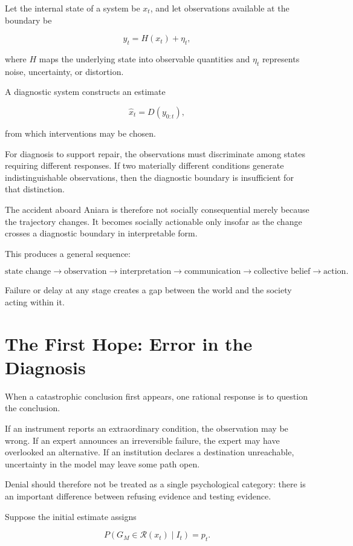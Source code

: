 \documentclass[11pt,oneside]{book}
\theoremstyle{definition}
\theoremstyle{remark}
\newcommand{\R}{\mathcal{R}}
\begin{document}
Let the internal state of a system be \(x_t\), and let observations available at the boundary be

\[
y_t
=
H(x_t)+\eta_t,
\]

where \(H\) maps the underlying state into observable quantities and \(\eta_t\) represents noise, uncertainty, or distortion.

A diagnostic system constructs an estimate

\[
\hat x_t
=
D(y_{0:t}),
\]

from which interventions may be chosen.

For diagnosis to support repair, the observations must discriminate among states requiring different responses. If two materially different conditions generate indistinguishable observations, then the diagnostic boundary is insufficient for that distinction.

The accident aboard Aniara is therefore not socially consequential merely because the trajectory changes. It becomes socially actionable only insofar as the change crosses a diagnostic boundary in interpretable form.

This produces a general sequence:

\[
\text{state change}
\rightarrow
\text{observation}
\rightarrow
\text{interpretation}
\rightarrow
\text{communication}
\rightarrow
\text{collective belief}
\rightarrow
\text{action}.
\]

Failure or delay at any stage creates a gap between the world and the society acting within it.

\section{The First Hope: Error in the Diagnosis}

When a catastrophic conclusion first appears, one rational response is to question the conclusion.

If an instrument reports an extraordinary condition, the observation may be wrong. If an expert announces an irreversible failure, the expert may have overlooked an alternative. If an institution declares a destination unreachable, uncertainty in the model may leave some path open.

Denial should therefore not be treated as a single psychological category: there is an important difference between refusing evidence and testing evidence.

Suppose the initial estimate assigns

\[
P(G_M\in\R(x_t)\mid I_t)=p_t.
\]
\end{document}
